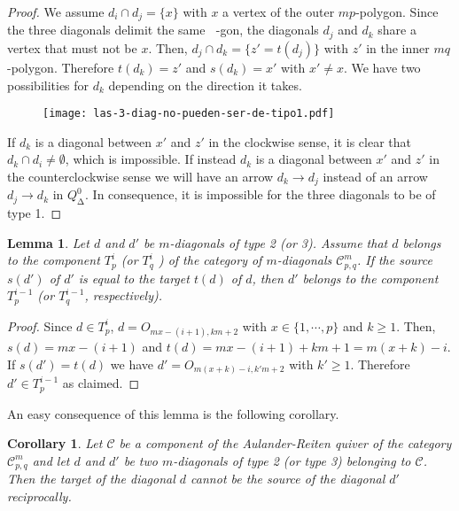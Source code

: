 \documentclass{amsart}
\theoremstyle{plain}
\newtheorem{lema}[teo]{Lemma}
\newtheorem{coro}[teo]{Corollary}
\theoremstyle{definition}
\begin{document}
\begin{proof}
We assume $d_i\cap d_j=\{x\}$ with $x$ a vertex of the  outer $mp$-polygon. Since the three diagonals delimit the same  ${\mathop{(m+2)}\nolimits}$-gon, the diagonals $d_j$ and $d_k$ share a vertex that must not be   $x$. Then, $d_j\cap d_k=\{z'=t(d_j)\}$ with $z'$ in the inner  $mq$-polygon. Therefore $t(d_k)=z'$ and $s(d_k)=x'$  with  $x'\neq x$. We have two possibilities for  $d_k$  depending on the direction it takes.

\begin{figure}[H]
\begin{center}
\texttt{[image: las-3-diag-no-pueden-ser-de-tipo1.pdf]}
\end{center}
\end{figure}

\vspace*{-1.5cm}
If $d_k$ is a diagonal between  $x'$ and $z'$ in the clockwise sense, it is clear that   $d_k\cap d_i \neq \emptyset$, which is impossible. If instead  $d_k$ is a  diagonal between $x'$ and $z'$ in the counterclockwise sense we will have an arrow $d_k\rightarrow d_j$ instead of an arrow $d_j\rightarrow d_k$ in  $Q_{\mathop{\Delta}\nolimits}^0$. In consequence,  it is impossible for the three diagonals to be of type 1.

\end{proof}

\begin{lema}\label{final de una diagonal comienzo de la otra}
Let $d$ and $d'$  be   $m$-diagonals of type 2 (or 3). Assume that $d$ belongs to the component $T_p^{i}$  (or $T_q^{i}$ )  of the category of   $m$-diagonals $\mathcal{C}^m_{p,q}$. If the  source $s(d')$ of  $d'$ is equal to the target  $t(d)$ of $d$, then $d'$ belongs to the component  $T_p^{i-1}$ (or $T_q^{i-1}$, respectively).
\end{lema}

\begin{proof}
Since $d \in T_p^{i}$, $d=O_{mx-(i+1),km+2}$ with $x\in \{1,\cdots,p\}$ and $k\geq 1$.  Then, $s(d)=mx-(i+1)$ and $t(d)=mx-(i+1)+km+1=m(x+k)-i$. If $s(d')=t(d)$ we have  $d'=O_{m(x+k)-i,k'm+2} $ with $k'\geq1$. Therefore $d'\in T_p^{i-1}$ as claimed.
\end{proof}

An easy consequence of this lemma is the following corollary.

\begin{coro}
Let $\mathcal{C}$ be a component of the Aulander-Reiten quiver of the category $\mathcal{C}^m_{p,q}$ and let $d$ and $d'$ be two  $m$-diagonals of type 2 (or type 3) belonging to $\mathcal{C}$. Then the target of the diagonal  $d$ cannot be the source of the diagonal $d'$ reciprocally.
\end{coro}
\end{document}
